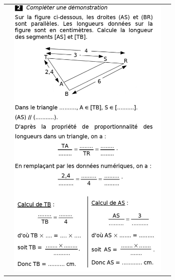 \documentclass[12pt, twoside]{article}
\begin{document}
\begin{landscape}
\begin{tabular}{ccc}
\begin{minipage}{8cm}
\end{minipage}
&
\begin{minipage}{8cm}
\includegraphics[width=8cm]{images/ex2.jpg}

\bigskip


\end{minipage}
\end{tabular}
\end{landscape}
\end{document}
